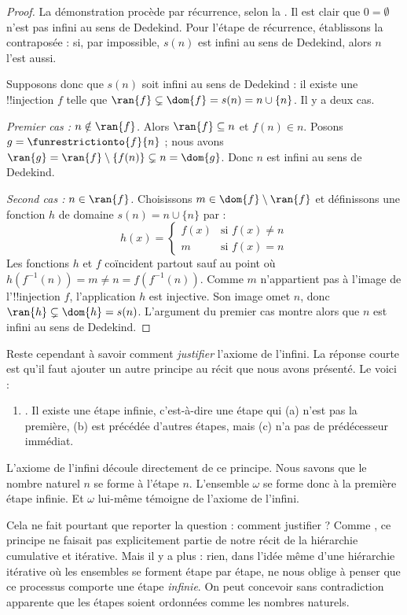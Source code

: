 \documentclass[../../../include/open-logic-section]{subfiles}
\begin{document}
\begin{proof}
La démonstration procède par récurrence, selon la
. Il est
clair que $0 = \emptyset$ n'est pas infini au sens de Dedekind. Pour
l'étape de récurrence, établissons la contraposée : si, par impossible,
$s(n)$ est infini au sens de Dedekind, alors $n$ l'est aussi.

Supposons donc que $s(n)$ soit infini au sens de Dedekind : il existe
une !!{injection} $f$ telle que
$\ran{f}\subsetneq \dom{f} = s(n) = n \cup \{n\}$. Il y a deux cas.

\emph{Premier cas : $n \notin \ran{f}$.} Alors $\ran{f} \subseteq n$
et $f(n) \in n$. Posons $g = \funrestrictionto{f}{n}$ ; nous avons
$\ran{g} = \ran{f} \setminus \{f(n)\} \subsetneq n = \dom{g}$.
Donc $n$ est infini au sens de Dedekind.

\emph{Second cas : $n \in \ran{f}$.} Choisissons
$m \in \dom{f} \setminus \ran{f}$ et définissons une fonction $h$
de domaine $s(n) = n \cup \{n\}$ par :
\[
h(x) =
	\begin{cases}
		f(x) & \text{si }f(x) \neq n\\
		m & \text{si }f(x)=n
	\end{cases}
\]
Les fonctions $h$ et $f$ coïncident partout sauf au point où
$h(f^{-1}(n)) = m \neq n = f(f^{-1}(n))$. Comme $m$ n'appartient pas
à l'image de l'!!{injection} $f$, l'application $h$ est injective.
Son image omet $n$, donc $\ran{h} \subsetneq \dom{h} = s(n)$.
L'argument du premier cas montre alors que $n$ est infini au sens
de Dedekind.
\end{proof}

Reste cependant à savoir comment \emph{justifier} l'axiome de l'infini.
La réponse courte est qu'il faut ajouter un autre principe au récit
que nous avons présenté. Le voici :
\begin{enumerate}
	\item[] \stagesinf. Il existe une étape infinie, c'est-à-dire une
	étape qui (a) n'est pas la première, (b) est précédée d'autres
	étapes, mais (c) n'a pas de prédécesseur immédiat.
\end{enumerate}
L'axiome de l'infini découle directement de ce principe. Nous savons
que le nombre naturel $n$ se forme à l'étape $n$. L'ensemble $\omega$
se forme donc à la première étape infinie. Et $\omega$ lui-même
témoigne de l'axiome de l'infini.

Cela ne fait pourtant que reporter la question : comment justifier
\stagesinf{} ? Comme \stagessucc, ce principe ne faisait pas
explicitement partie de notre récit de la hiérarchie cumulative et
itérative. Mais il y a plus : rien, dans l'idée même d'une hiérarchie
itérative où les ensembles se forment étape par étape, ne nous oblige
à penser que ce processus comporte une étape \emph{infinie}. On peut
concevoir sans contradiction apparente que les étapes soient ordonnées
comme les nombres naturels.
\end{document}
